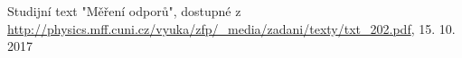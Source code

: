 \documentclass[0-protokol.tex]{subfiles}
\begin{document}
\begin{thebibliography}{}

Studijní text "Měření odporů", dostupné z\\ \url{http://physics.mff.cuni.cz/vyuka/zfp/_media/zadani/texty/txt_202.pdf}, 15. 10. 2017

\begin{comment}

\bibitem{cizek_1} 	%
Doc. Mgr. Jakub Čížek, PhD.: prezentace Úvod do praktické fyziky, seminář 1, dostupné z \url{http://physics.mff.cuni.cz/kfnt/vyuka/upf/seminar1.pdf}

\bibitem{cizek_9} 	%
Doc. Mgr. Jakub Čížek, PhD.: prezentace Úvod do praktické fyziky, seminář 9, dostupné z \url{http://physics.mff.cuni.cz/kfnt/vyuka/upf/seminar9.pdf}

\bibitem{cizek_10}	%
Doc. Mgr. Jakub Čížek, PhD.: prezentace Úvod do praktické fyziky, seminář 10, dostupné z \url{http://physics.mff.cuni.cz/kfnt/vyuka/upf/seminar10.pdf}

\end{comment}

\end{thebibliography}
\end{document}
